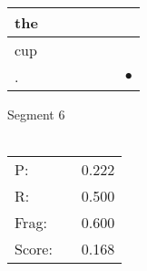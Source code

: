 \documentclass[landscape]{article}
\newcommand{\ssp}{\hspace{2pt}}
\newcommand{\mex}{\cellcolor{g}$\bullet$}
\begin{document}
\begin{tabular}{|l|p{10pt}|p{10pt}|p{10pt}|p{10pt}|p{10pt}|p{10pt}|}
\hline
\ssp the \ssp&\hspace{2pt}&\hspace{2pt}&\hspace{2pt}&\hspace{2pt}&\hspace{2pt}&\hspace{2pt}\\
\hline
\ssp cup \ssp&\hspace{2pt}&\hspace{2pt}&\hspace{2pt}&\hspace{2pt}&\hspace{2pt}&\hspace{2pt}\\
\hline
\ssp \cellcolor{ref5}. \ssp&\hspace{2pt}&\hspace{2pt}&\hspace{2pt}&\hspace{2pt}&\hspace{2pt}&\hspace{2pt}\mex\\
\hline
\end{tabular}

\vspace{6pt}
\noindent Segment 6\\\\
\noindent\begin{tabular}{lm{12pt}r}
\hline
P:&&0.222\\
R:&&0.500\\
Frag:&&0.600\\
Score:&&0.168\\
\end{tabular}

\newpage
\end{document}
